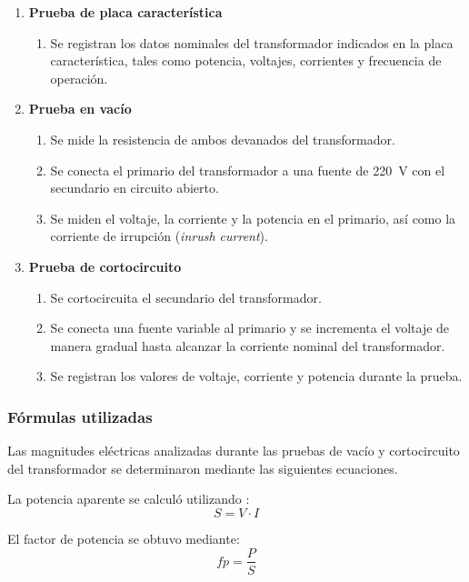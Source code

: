 \documentclass[conference]{IEEEtran}
\begin{document}
\begin{enumerate}
    \item \textbf{Prueba de placa característica}
    \begin{enumerate}
        \item Se registran los datos nominales del transformador indicados en la placa característica, tales como potencia, voltajes, corrientes y frecuencia de operación.
    \end{enumerate}

    \item \textbf{Prueba en vacío}
    \begin{enumerate}
        \item Se mide la resistencia de ambos devanados del transformador.
        \item Se conecta el primario del transformador a una fuente de 220~V con el secundario en circuito abierto.
        \item Se miden el voltaje, la corriente y la potencia en el primario, así como la corriente de irrupción (\textit{inrush current}).
    \end{enumerate}

    \item \textbf{Prueba de cortocircuito}
    \begin{enumerate}
        \item Se cortocircuita el secundario del transformador.
        \item Se conecta una fuente variable al primario y se incrementa el voltaje de manera gradual hasta alcanzar la corriente nominal del transformador.
        \item Se registran los valores de voltaje, corriente y potencia durante la prueba.
    \end{enumerate}
\end{enumerate}

\subsubsection{Fórmulas utilizadas}
Las magnitudes eléctricas analizadas durante las pruebas de vacío y cortocircuito del transformador se determinaron mediante las siguientes ecuaciones.

La potencia aparente se calculó utilizando \cite{alexander}:
\begin{equation}
    S = V \cdot I
\end{equation}

El factor de potencia se obtuvo mediante:
\begin{equation}
    fp = \frac{P}{S}
\end{equation}
\end{document}
